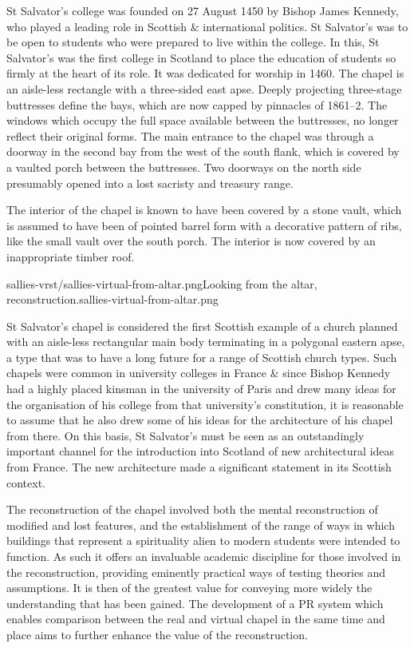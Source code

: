 St Salvator's college was founded on 27 August 1450 by Bishop James Kennedy, who played a leading role in Scottish \& international politics. St Salvator’s was to be open to students who were prepared to live within the college. In this, St Salvator’s was the first college in Scotland to place the education of students so firmly at the heart of its role. It was dedicated for worship in 1460. The chapel is an aisle-less rectangle with a three-sided east apse. Deeply projecting three-stage buttresses define the bays, which are now capped by pinnacles of 1861–2. The windows which occupy the full space available between the buttresses, no longer reflect their original forms. The main entrance to the chapel was through a doorway in the second bay from the west of the south flank, which is covered by a vaulted porch between the buttresses. Two doorways on the north side presumably opened into a lost sacristy and treasury range.

The interior of the chapel is known to have been covered by a stone vault, which is assumed to have been of pointed barrel form with a decorative pattern of ribs, like the small vault over the south porch. The interior is now covered by an inappropriate timber roof.

       {sallies-vrst/sallies-virtual-from-altar.png}{Looking from the altar, reconstruction.}{sallies-virtual-from-altar.png}

St Salvator’s chapel is considered the first Scottish example of a church planned with an aisle-less rectangular main body terminating in a polygonal eastern apse, a type that was to have a long future for a range of Scottish church types. Such chapels were common in university colleges in France \& since Bishop Kennedy had a highly placed kinsman in the university of Paris and drew many ideas for the organisation of his college from that university’s constitution, it is reasonable to assume that he also drew some of his ideas for the architecture of his chapel from there. On this basis, St Salvator’s must be seen as an outstandingly important channel for the introduction into Scotland of new architectural ideas from France. The new architecture made a significant statement in its Scottish context. 

The reconstruction of the chapel involved both the mental reconstruction of modified and lost features, and the establishment of the range of ways in which buildings that represent a spirituality alien to modern students were intended to function. As such it offers an invaluable academic discipline for those involved in the reconstruction, providing eminently practical ways of testing theories and assumptions. It is then of the greatest value for conveying more widely the understanding that has been gained. The development of a PR system which enables comparison between the real and virtual chapel in the same time and place aims to further enhance the value of the reconstruction.


